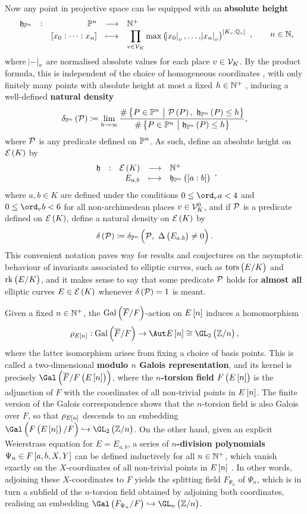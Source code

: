 Now any point in projective space can be equipped with an \textbf{absolute height}
$$ \function[\hhh_{\PP^n}]{\PP^n}{\NN^+}{\sbr{x_0 : \dots : x_n}}{\displaystyle\PV\max\br{\abs{x_0}_v, \dots, \abs{x_n}_v}^{\sbr{K_v : \QQ_v}}}, \qquad n \in \NN, $$
where $ \abs{-}_v $ are normalised absolute values for each place $ v \in \mathcal{V}_K $. By the product formula, this is independent of the choice of homogeneous coordinates \cite[Proposition VIII.5.4]{Sil09}, with only finitely many points with absolute height at most a fixed $ h \in \mathbb{N}^+ $ \cite[Theorem VIII.5.11]{Sil09}, inducing a well-defined \textbf{natural density}
$$ \delta_{\PP^n}\br{\PPP} \coloneqq \lim_{h \to \infty} \dfrac{\#\cbr{P \in \PP^n \st \PPP\br{P}, \ \hhh_{\PP^n}\br{P} \le h}}{\#\cbr{P \in \PP^n \st \hhh_{\PP^n}\br{P} \le h}}, $$
where $ \mathcal{P} $ is any predicate defined on $ \mathbb{P}^n $. As such, define an absolute height on $ \EEE\br{K} $ by
$$ \function[\hhh]{\EEE\br{K}}{\NN^+}{E_{a, b}}{\hhh_{\PP^n}\br{\sbr{a : b}}}, $$
where $ a, b \in K $ are defined under the conditions $ 0 \le \ord_v a < 4 $ and $ 0 \le \ord_v b < 6 $ for all non-archimedean places $ v \in \mathcal{V}_K^0 $, and if $ \mathcal{P} $ is a predicate defined on $ \EEE\br{K} $, define a natural density on $ \EEE\br{K} $ by
$$ \delta\br{\PPP} \coloneqq \delta_{\PP^n}\br{\PPP, \ \Delta\br{E_{a, b}} \ne 0}. $$
This convenient notation paves way for results and conjectures on the asymptotic behaviour of invariants associated to elliptic curves, such as $ \torsE $ and $ \rkE $, and it makes sense to say that some predicate $ \mathcal{P} $ holds for \textbf{almost all} elliptic curves $ E \in \EEE\br{K} $ whenever $ \delta\br{\PPP} = 1 $ is meant.

Given a fixed $ n \in \mathbb{N}^+ $, the $ \AG{F} $-action on $ E\sbr{n} $ induces a homomorphism
$$ \rho_{E\sbr{n}} : \AG{F} \to \Aut E\sbr{n} \cong \GL_2\br{\ZZ / n}, $$
where the latter isomorphism arises from fixing a choice of basis points. This is called a two-dimensional \textbf{modulo $ n $ Galois representation}, and its kernel is precisely $ \Gal\br{\overline{F} / F\br{E\sbr{n}}} $, where the \textbf{$ n $-torsion field} $ F\br{E\sbr{n}} $ is the adjunction of $ F $ with the coordinates of all non-trivial points in $ E\sbr{n} $. The finite version of the Galois correspondence shows that the $ n $-torsion field is also Galois over $ F $, so that $ \rho_{E\sbr{n}} $ descends to an embedding $ \Gal\br{F\br{E\sbr{n}} / F} \hookrightarrow \GL_2\br{\ZZ / n} $. On the other hand, given an explicit Weierstrass equation for $ E = E_{a, b} $, a series of \textbf{$ n $-division polynomials} $ \Psi_n \in F\sbr{a, b, X, Y} $ can be defined inductively for all $ n \in \mathbb{N}^+ $, which vanish exactly on the $ X $-coordinates of all non-trivial points in $ E\sbr{n} $ \cite[Exercise 3.7]{Sil09}. In other words, adjoining these $ X $-coordinates to $ F $ yields the splitting field $ F_{\Psi_n} $ of $ \Psi_n $, which is in turn a subfield of the $ n $-torsion field obtained by adjoining both coordinates, realising an embedding $ \Gal\br{F_{\Psi_n} / F} \hookrightarrow \GL_n\br{\ZZ / n} $.

